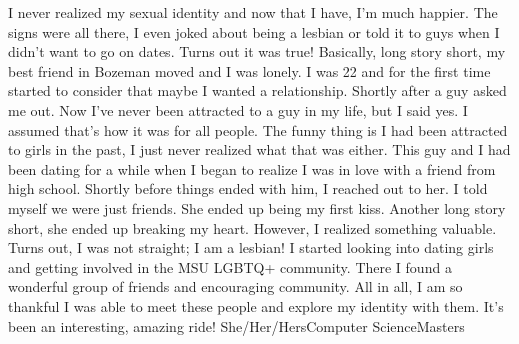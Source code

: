 {I never realized my sexual identity and now that I have, I’m much happier. 
The signs were all there, I even joked about being a lesbian or told it to 
guys when I didn’t want to go on dates. Turns out it was true! Basically, long 
story short, my best friend in Bozeman moved and I was lonely. I was 22 and for
the first time started to consider that maybe I wanted a relationship. Shortly 
after a guy asked me out. Now I’ve never been attracted to a guy in my life, 
but I said yes. I assumed that’s how it was for all people. The funny thing is 
I had been attracted to girls in the past, I just never realized what that was 
either. This guy and I had been dating for a while when I began to realize I 
was in love with a friend from high school. Shortly before things ended with 
him, I reached out to her. I told myself we were just friends. She ended up 
being my first kiss. Another long story short, she ended up breaking my heart. 
However, I realized something valuable. Turns out, I was not straight; I am a 
lesbian! I started looking into dating girls and getting involved in the MSU 
LGBTQ+ community. There I found a wonderful group of friends and encouraging 
community. All in all, I am so thankful I was able to meet these people and 
explore my identity with them. It’s been an interesting, amazing ride!}
{She/Her/Hers}{Computer Science}{Masters}
{\lesbianflagstory}
